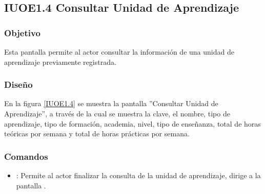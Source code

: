 \subsection{IUOE1.4 Consultar Unidad de Aprendizaje}

\subsubsection{Objetivo}
	Esta pantalla permite al actor consultar la información de una unidad de aprendizaje previamente registrada.

\subsubsection{Diseño}
	En la figura \ref{IUOE1.4} se muestra la pantalla ''Consultar Unidad de Aprendizaje'', a través de la cual se muestra la clave, el nombre, tipo de aprendizaje, tipo de formación, academia, nivel, tipo de enseñanza, total de horas teóricas por semana y total de horas prácticas por semana.


\subsubsection{Comandos}
\begin{itemize}
	\item {}: Permite al actor finalizar la consulta de la unidad de aprendizaje, dirige a la pantalla .

\end{itemize}
